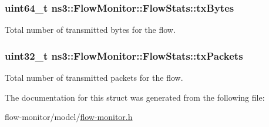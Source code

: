 \subsubsection[{\texorpdfstring{tx\+Bytes}{txBytes}}]{\setlength{\rightskip}{0pt plus 5cm}uint64\+\_\+t ns3\+::\+Flow\+Monitor\+::\+Flow\+Stats\+::tx\+Bytes}\hypertarget{structns3_1_1FlowMonitor_1_1FlowStats_ad2cfc997073dcd4a723b54c26e4ca2c8}{}\label{structns3_1_1FlowMonitor_1_1FlowStats_ad2cfc997073dcd4a723b54c26e4ca2c8}


Total number of transmitted bytes for the flow. 

\subsubsection[{\texorpdfstring{tx\+Packets}{txPackets}}]{\setlength{\rightskip}{0pt plus 5cm}uint32\+\_\+t ns3\+::\+Flow\+Monitor\+::\+Flow\+Stats\+::tx\+Packets}\hypertarget{structns3_1_1FlowMonitor_1_1FlowStats_ad2692665c1bb2e79be11bf704c3cc2be}{}\label{structns3_1_1FlowMonitor_1_1FlowStats_ad2692665c1bb2e79be11bf704c3cc2be}


Total number of transmitted packets for the flow. 



The documentation for this struct was generated from the following file\+:\begin{DoxyCompactItemize}
\item 
flow-\/monitor/model/\hyperlink{flow-monitor_8h}{flow-\/monitor.\+h}\end{DoxyCompactItemize}

